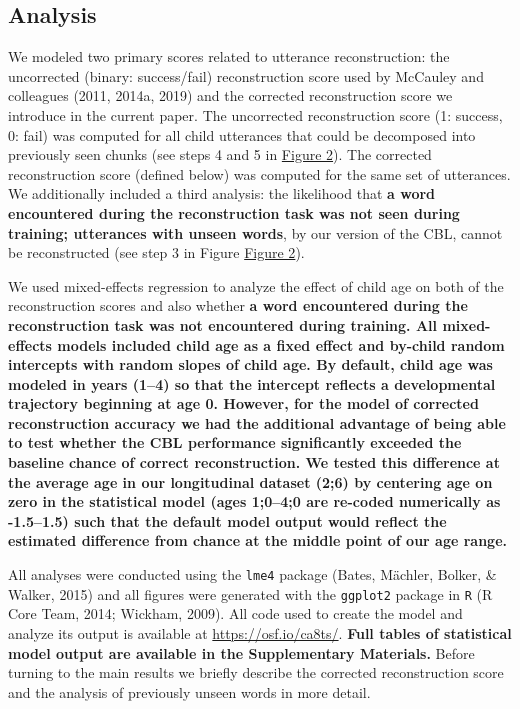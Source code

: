 \documentclass[man,mask,floatsintext]{apa6}
\begin{document}
\subsection{Analysis}\label{analysis}

We modeled two primary scores related to utterance reconstruction: the
uncorrected (binary: success/fail) reconstruction score used by McCauley
and colleagues (2011, 2014a, 2019) and the corrected reconstruction
score we introduce in the current paper. The uncorrected reconstruction
score (1: success, 0: fail) was computed for all child utterances that
could be decomposed into previously seen chunks (see steps 4 and 5 in
\protect\hyperlink{fig2}{Figure 2}). The corrected reconstruction score
(defined below) was computed for the same set of utterances. We
additionally included a third analysis: the likelihood that \textbf{a
word encountered during the reconstruction task was not seen during
training; utterances with unseen words}, by our version of the CBL,
cannot be reconstructed (see step 3 in Figure
\protect\hyperlink{fig2}{Figure 2}).

We used mixed-effects regression to analyze the effect of child age on
both of the reconstruction scores and also whether \textbf{a word
encountered during the reconstruction task was not encountered during
training. All mixed-effects models included child age as a fixed effect
and by-child random intercepts with random slopes of child age. By
default, child age was modeled in years (1--4) so that the intercept
reflects a developmental trajectory beginning at age 0. However, for the
model of corrected reconstruction accuracy we had the additional
advantage of being able to test whether the CBL performance
significantly exceeded the baseline chance of correct reconstruction. We
tested this difference at the average age in our longitudinal dataset
(2;6) by centering age on zero in the statistical model (ages 1;0--4;0
are re-coded numerically as -1.5--1.5) such that the default model
output would reflect the estimated difference from chance at the middle
point of our age range.}

All analyses were conducted using the \texttt{lme4} package (Bates,
Mächler, Bolker, \& Walker, 2015) and all figures were generated with
the \texttt{ggplot2} package in \texttt{R} (R Core Team, 2014; Wickham,
2009). All code used to create the model and analyze its output is
available at \href{}{https://osf.io/ca8ts/}. \textbf{Full tables of
statistical model output are available in the Supplementary Materials.}
Before turning to the main results we briefly describe the corrected
reconstruction score and the analysis of previously unseen words in more
detail.
\end{document}
